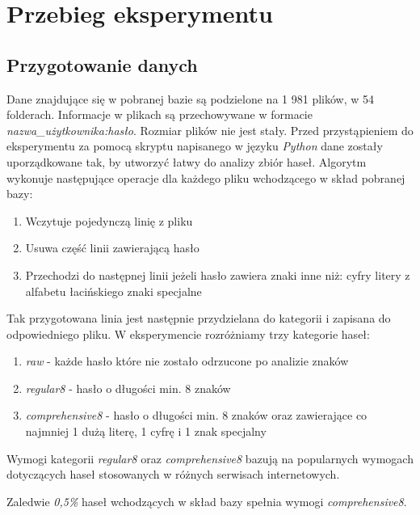 \documentclass{article}
\begin{document}
	\newpage
	\section{Przebieg eksperymentu}
	\subsection{Przygotowanie danych}
	Dane znajdujące się w pobranej bazie są podzielone na 1 981 plików, w 54 folderach. Informacje w plikach są przechowywane w formacie \textit{nazwa\_użytkownika:hasło}. Rozmiar plików nie jest stały. Przed przystąpieniem do eksperymentu za pomocą skryptu napisanego w języku \textit{Python} dane zostały uporządkowane tak, by utworzyć łatwy do analizy zbiór haseł. Algorytm wykonuje następujące operacje dla każdego pliku wchodzącego w skład pobranej bazy:
	\begin{enumerate}
		\item Wczytuje pojedynczą linię z pliku
		\item Usuwa część linii zawierającą hasło
		\item Przechodzi do następnej linii jeżeli hasło zawiera znaki inne niż:
			\subitem cyfry
			\subitem litery z alfabetu łacińskiego
			\subitem znaki specjalne	
	\end{enumerate}	
	Tak przygotowana linia jest następnie przydzielana do kategorii i zapisana do odpowiedniego pliku. W eksperymencie rozróżniamy trzy kategorie haseł:
	\begin{enumerate}
		\item \textit{raw} - każde hasło które nie zostało odrzucone po analizie znaków
		\item \textit{regular8} - hasło o długości min. 8 znaków
		\item \textit{comprehensive8} - hasło o długości min. 8 znaków oraz zawierające co najmniej 1 dużą literę, 1 cyfrę i 1 znak specjalny
	\end{enumerate}
	Wymogi kategorii \textit{regular8} oraz \textit{comprehensive8} bazują na popularnych wymogach dotyczących haseł stosowanych w różnych serwisach internetowych. 
	
	Zaledwie \textit{0,5\%} haseł wchodzących w skład bazy spełnia wymogi \textit{comprehensive8}.
	
	
\end{document}
